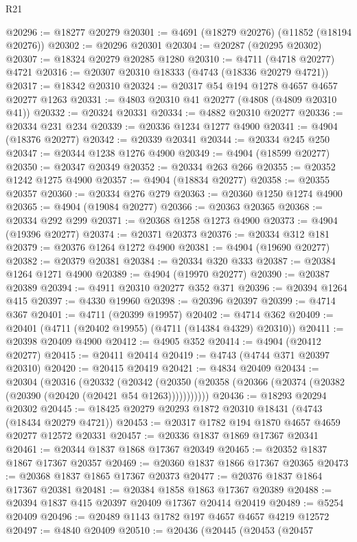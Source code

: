 \begin{lexlean}{R21}
\begin{coremodule}
@20296 := @18277 @20279
@20301 := @4691 (@18279 @20276) (@11852 (@18194 @20276))
@20302 := @20296 @20301
@20304 := @20287 (@20295 @20302)
@20307 := @18324 @20279 @20285 @1280
@20310 := @4711 (@4718 @20277) @4721
@20316 := @20307 @20310 @18333 (@4743 (@18336 @20279 @4721))
@20317 := @18342 @20310
@20324 := @20317 @54 @194 @1278 @4657 @4657 @20277 @1263
@20331 := @4803 @20310 @41 @20277 (@4808 (@4809 @20310 @41))
@20332 := @20324 @20331
@20334 := @4882 @20310 @20277
@20336 := @20334 @231 @234
@20339 := @20336 @1234 @1277 @4900
@20341 := @4904 (@18376 @20277)
@20342 := @20339 @20341
@20344 := @20334 @245 @250
@20347 := @20344 @1238 @1276 @4900
@20349 := @4904 (@18599 @20277)
@20350 := @20347 @20349
@20352 := @20334 @263 @266
@20355 := @20352 @1242 @1275 @4900
@20357 := @4904 (@18834 @20277)
@20358 := @20355 @20357
@20360 := @20334 @276 @279
@20363 := @20360 @1250 @1274 @4900
@20365 := @4904 (@19084 @20277)
@20366 := @20363 @20365
@20368 := @20334 @292 @299
@20371 := @20368 @1258 @1273 @4900
@20373 := @4904 (@19396 @20277)
@20374 := @20371 @20373
@20376 := @20334 @312 @181
@20379 := @20376 @1264 @1272 @4900
@20381 := @4904 (@19690 @20277)
@20382 := @20379 @20381
@20384 := @20334 @320 @333
@20387 := @20384 @1264 @1271 @4900
@20389 := @4904 (@19970 @20277)
@20390 := @20387 @20389
@20394 := @4911 @20310 @20277 @352 @371
@20396 := @20394 @1264 @415
@20397 := @4330 @19960
@20398 := @20396 @20397
@20399 := @4714 @367
@20401 := @4711 (@20399 @19957)
@20402 := @4714 @362
@20409 := @20401 (@4711 (@20402 @19955) (@4711 (@14384 @4329) @20310))
@20411 := @20398 @20409 @4900
@20412 := @4905 @352
@20414 := @4904 (@20412 @20277)
@20415 := @20411 @20414
@20419 := @4743 (@4744 @371 @20397 @20310)
@20420 := @20415 @20419
@20421 := @4834 @20409
@20434 := @20304
    (@20316
      (@20332
        (@20342 (@20350 (@20358 (@20366 (@20374 (@20382 (@20390 (@20420 (@20421 @54 @1263)))))))))))
@20436 := @18293 @20294 @20302
@20445 := @18425 @20279 @20293 @1872 @20310 @18431 (@4743 (@18434 @20279 @4721))
@20453 := @20317 @1782 @194 @1870 @4657 @4659 @20277 @12572 @20331
@20457 := @20336 @1837 @1869 @17367 @20341
@20461 := @20344 @1837 @1868 @17367 @20349
@20465 := @20352 @1837 @1867 @17367 @20357
@20469 := @20360 @1837 @1866 @17367 @20365
@20473 := @20368 @1837 @1865 @17367 @20373
@20477 := @20376 @1837 @1864 @17367 @20381
@20481 := @20384 @1858 @1863 @17367 @20389
@20488 := @20394 @1837 @415 @20397 @20409 @17367 @20414 @20419
@20489 := @5254 @20409
@20496 := @20489 @1143 @1782 @197 @4657 @4657 @4219 @12572
@20497 := @4840 @20409
@20510 := @20436
    (@20445
      (@20453
        (@20457

\end{coremodule}
\end{lexlean}

